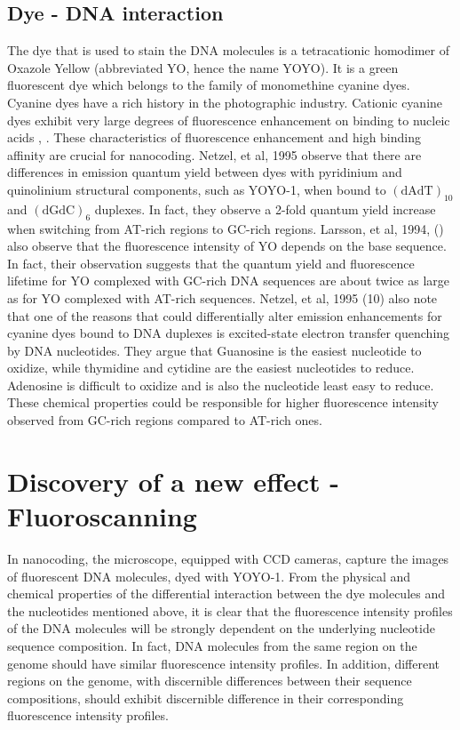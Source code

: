 \subsection*{Dye - DNA interaction} 
The dye that is used to stain the DNA molecules is a tetracationic homodimer of Oxazole Yellow (abbreviated YO, hence the name YOYO). It is a green fluorescent dye which belongs to the family of monomethine cyanine dyes. Cyanine dyes have a rich history in the photographic industry. Cationic  cyanine dyes  exhibit very large degrees of fluorescence enhancement on binding to nucleic acids \cite{Rye_etal_1992_NAR}, \cite{Lee_etal_1986_Cytometry}. These  characteristics of fluorescence enhancement and  high binding affinity are crucial for nanocoding. Netzel, et al, 1995 \cite{Netzel_etal_1995_JPC} observe that there are differences in emission quantum yield between dyes with pyridinium and quinolinium structural components, such as YOYO-1, when bound to $(\text{dAdT})_{10}$ and $(\text{dGdC})_6$ duplexes. In fact, they observe a 2-fold quantum yield increase when switching from AT-rich regions to GC-rich regions. Larsson, et al, 1994, (\cite{Larsson_etal_1994_JACS}) also observe that the fluorescence intensity of YO depends on the base sequence. In fact, their observation suggests that the quantum yield and fluorescence lifetime for YO complexed with GC-rich DNA sequences are about twice as large as for YO complexed with AT-rich sequences. Netzel, et al, 1995 (10) also note that one of the reasons that could differentially alter emission enhancements for cyanine dyes bound to DNA  duplexes is excited-state electron transfer quenching by DNA nucleotides. They argue that Guanosine is the easiest nucleotide to oxidize, while thymidine and cytidine are the easiest nucleotides to reduce. Adenosine is difficult to oxidize and is also the nucleotide least easy to reduce. These chemical properties could be responsible for higher fluorescence intensity observed from GC-rich regions compared to AT-rich ones. 

\section{Discovery of a new effect - Fluoroscanning}
In nanocoding, the microscope, equipped with CCD cameras, capture the images of fluorescent DNA molecules, dyed with YOYO-1. From the physical and chemical properties of the differential interaction between the dye molecules and the nucleotides mentioned above, it is clear that the fluorescence intensity profiles of the DNA molecules will be strongly dependent on the underlying nucleotide sequence composition. In fact, DNA molecules from the same region on the genome should have similar  fluorescence intensity profiles. In addition, different regions on the genome, with discernible differences between their sequence compositions, should exhibit discernible difference in their corresponding  fluorescence intensity profiles. \\

